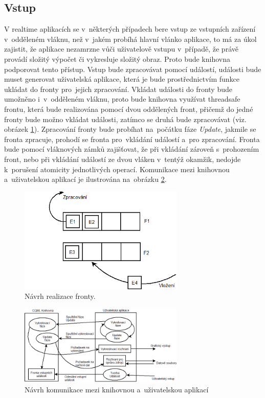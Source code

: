 \documentclass[11pt,twoside,a4paper]{book}
\begin{document}
\subsection {Vstup}
V realtime aplikacích se v~některých případech bere vstup ze vstupních zařízení v~odděleném vláknu, než v~jakém probíhá hlavní vlánko aplikace, to má za úkol zajistit, že aplikace nezamrzne vůči uživatelově vstupu v~případě, že právě provádí složitý výpočet či vykresluje složitý obraz. Proto bude knihovna podporovat tento přístup. Vstup bude zpracovávat pomocí událostí, události bude muset generovat uživatelská aplikace, která je bude prostřednictvím funkce ukládat do fronty pro~jejich zpracování. Vkládat události do fronty bude umožněno i~v~odděleném vláknu, proto bude knihovna využívat threadsafe frontu, která bude realizována pomocí dvou oddělených front, přičemž do jedné fronty bude možno vkládat události, zatímco se druhá bude zpracovávat (viz. obrázek \ref{fig:que1N}). Zpracování fronty bude probíhat na~počátku fáze \textit{Update}, jakmile se fronta zpracuje, prohodí se fronta pro~vkládání událostí a~pro zpracování. Fronta bude pomocí vláknových zámků zajišťovat, že při vkládání zároveň s~prohozením front, nebo při vkládání událostí ze dvou vláken v~tentýž okamžik, nedojde k~porušení atomicity jednotlivých operací. Komunikace mezi knihovnou a~uživatelskou aplikací je ilustrována na~obrázku \ref{fig:lib1N}.\\
\begin{figure}[!ht]
\begin{center}
  \includegraphics[width=0.7\textwidth]{Diagram5}
\caption{{\label{fig:que1N}}Návrh realizace fronty.}
\end{center}
\end{figure}
\begin{figure}[!ht]
\begin{center}
  \includegraphics[width=0.7\textwidth]{Diagram4}
\caption{{\label{fig:lib1N}}Návrh komunikace mezi knihovnou a~uživatelskou aplikací}
\end{center}
\end{figure}
\end{document}
